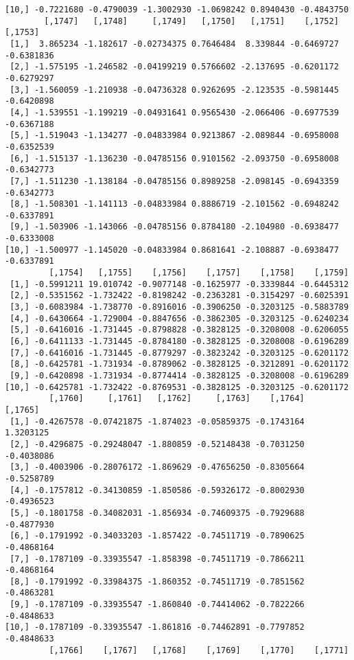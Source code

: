 \documentclass[
  letterpaper,
  DIV=11,
  numbers=noendperiod]{scrreprt}
\begin{document}
\begin{verbatim}
[10,] -0.7221680 -0.4790039 -1.3002930 -1.0698242 0.8940430 -0.4843750
        [,1747]   [,1748]     [,1749]   [,1750]   [,1751]    [,1752]    [,1753]
 [1,]  3.865234 -1.182617 -0.02734375 0.7646484  8.339844 -0.6469727 -0.6381836
 [2,] -1.575195 -1.246582 -0.04199219 0.5766602 -2.137695 -0.6201172 -0.6279297
 [3,] -1.560059 -1.210938 -0.04736328 0.9262695 -2.123535 -0.5981445 -0.6420898
 [4,] -1.539551 -1.199219 -0.04931641 0.9565430 -2.066406 -0.6977539 -0.6367188
 [5,] -1.519043 -1.134277 -0.04833984 0.9213867 -2.089844 -0.6958008 -0.6352539
 [6,] -1.515137 -1.136230 -0.04785156 0.9101562 -2.093750 -0.6958008 -0.6342773
 [7,] -1.511230 -1.138184 -0.04785156 0.8989258 -2.098145 -0.6943359 -0.6342773
 [8,] -1.508301 -1.141113 -0.04833984 0.8886719 -2.101562 -0.6948242 -0.6337891
 [9,] -1.503906 -1.143066 -0.04785156 0.8784180 -2.104980 -0.6938477 -0.6333008
[10,] -1.500977 -1.145020 -0.04833984 0.8681641 -2.108887 -0.6938477 -0.6337891
         [,1754]   [,1755]    [,1756]    [,1757]    [,1758]    [,1759]
 [1,] -0.5991211 19.010742 -0.9077148 -0.1625977 -0.3339844 -0.6445312
 [2,] -0.5351562 -1.732422 -0.8198242 -0.2363281 -0.3154297 -0.6025391
 [3,] -0.6083984 -1.738770 -0.8916016 -0.3906250 -0.3203125 -0.5883789
 [4,] -0.6430664 -1.729004 -0.8847656 -0.3862305 -0.3203125 -0.6240234
 [5,] -0.6416016 -1.731445 -0.8798828 -0.3828125 -0.3208008 -0.6206055
 [6,] -0.6411133 -1.731445 -0.8784180 -0.3828125 -0.3208008 -0.6196289
 [7,] -0.6416016 -1.731445 -0.8779297 -0.3823242 -0.3203125 -0.6201172
 [8,] -0.6425781 -1.731934 -0.8789062 -0.3828125 -0.3212891 -0.6201172
 [9,] -0.6420898 -1.731934 -0.8774414 -0.3828125 -0.3208008 -0.6196289
[10,] -0.6425781 -1.732422 -0.8769531 -0.3828125 -0.3203125 -0.6201172
         [,1760]     [,1761]   [,1762]     [,1763]    [,1764]    [,1765]
 [1,] -0.4267578 -0.07421875 -1.874023 -0.05859375 -0.1743164  1.3203125
 [2,] -0.4296875 -0.29248047 -1.880859 -0.52148438 -0.7031250 -0.4038086
 [3,] -0.4003906 -0.28076172 -1.869629 -0.47656250 -0.8305664 -0.5258789
 [4,] -0.1757812 -0.34130859 -1.850586 -0.59326172 -0.8002930 -0.4936523
 [5,] -0.1801758 -0.34082031 -1.856934 -0.74609375 -0.7929688 -0.4877930
 [6,] -0.1791992 -0.34033203 -1.857422 -0.74511719 -0.7890625 -0.4868164
 [7,] -0.1787109 -0.33935547 -1.858398 -0.74511719 -0.7866211 -0.4868164
 [8,] -0.1791992 -0.33984375 -1.860352 -0.74511719 -0.7851562 -0.4863281
 [9,] -0.1787109 -0.33935547 -1.860840 -0.74414062 -0.7822266 -0.4848633
[10,] -0.1787109 -0.33935547 -1.861816 -0.74462891 -0.7797852 -0.4848633
         [,1766]    [,1767]   [,1768]    [,1769]    [,1770]    [,1771]

\end{verbatim}
\end{document}
